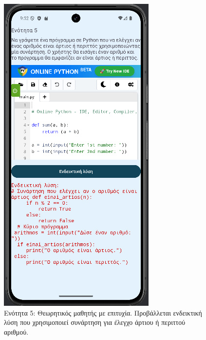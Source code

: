 \documentclass[11pt]{report}
\begin{document}
\begin{figure}[H]
  \centering
  \includegraphics[width=\linewidth, height=0.35\textheight, keepaspectratio]{Figures/εικόνα (22).png}
  \caption{Ενότητα 5: Θεωρητικός μαθητής με επιτυχία. Προβάλλεται ενδεικτική λύση που χρησιμοποιεί συνάρτηση για έλεγχο άρτιου ή περιττού αριθμού.}
\end{figure}
\end{document}
